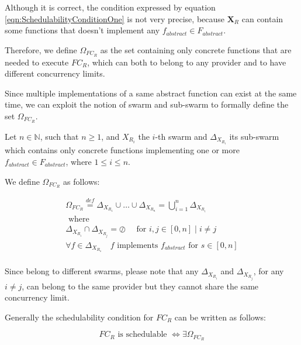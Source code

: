 \documentclass[10pt,a4paper]{article}
\newcommand{\mathDef}{\overset{\textit{def}}{=}}
\theoremstyle{definition}
\begin{document}
Although it is correct, the condition expressed by equation \ref{eqn:SchedulabilityConditionOne} is not very precise, because $\textbf{X}_R$ can contain some functions that doesn't implement any $f_{abstract} \in F_{abstract}$.

Therefore, we define $\Omega_{FC_R}$ as the set containing only concrete functions that are needed to execute $FC_R$, which can both to belong to any provider and to have different concurrency limits.

Since multiple implementations of a same abstract function can exist at the same time, we can exploit the notion of swarm and sub-swarm to formally define the set $\Omega_{FC_R}$.

Let $n \in \mathbb{N}$, such that $n \geq 1$, and $X_{R_i}$ the $i$-th swarm and $\Delta_{X_{R_i}}$ its sub-swarm which contains only concrete functions implementing one or more $f_{abstract} \in F_{abstract}$, where $1 \leq i \leq n$.

We define $\Omega_{FC_R}$ as follows: 

\begin{equation}
\begin{array}{c}
\Omega_{FC_R} \mathDef \Delta_{X_{R_1}} \cup  \ldots \cup \Delta_{X_{R_n}} = \bigcup_{i = 1}^n \Delta_{X_{R_i}} \\

\text{ where } \\	

\Delta_{X_{R_i}} \cap \Delta_{X_{R_j}} = \oslash \quad \text{ for } i,j \in \left[ 0, n \right] \mid i \neq j \\

\forall f \in \Delta_{X_{R_s}} \quad f \text{ implements } f_{abstract} \text{ for } s \in \left[ 0, n \right] \\

\end{array}
\end{equation}

Since belong to different swarms, please note that any $\Delta_{X_{R_i}}$ and $\Delta_{X_{R_j}}$, for any $i \neq j$, can belong to the same provider but they cannot share the same concurrency limit.

Generally the schedulability condition for $FC_R$ can be written as follows:

\begin{equation}
FC_R \text{ is schedulable } \Leftrightarrow \exists \Omega_{FC_R}
\end{equation}
\end{document}
